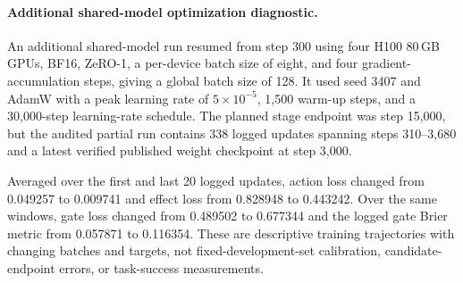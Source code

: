 \paragraph{Additional shared-model optimization diagnostic.}
An additional shared-model run resumed from step 300 using four H100
80\,GB GPUs, BF16, ZeRO-1, a per-device batch size of eight, and four
gradient-accumulation steps, giving a global batch size of 128.
It used seed 3407 and AdamW with a peak learning rate of $5\times10^{-5}$,
1,500 warm-up steps, and a 30,000-step learning-rate schedule.
The planned stage endpoint was step 15,000, but the audited partial run
contains 338 logged updates spanning steps 310--3,680 and a latest
verified published weight checkpoint at step 3,000.

Averaged over the first and last 20 logged updates, action loss changed
from 0.049257 to 0.009741 and effect loss from 0.828948 to 0.443242.
Over the same windows, gate loss changed from 0.489502 to 0.677344 and
the logged gate Brier metric from 0.057871 to 0.116354.
These are descriptive training trajectories with changing batches and
targets, not fixed-development-set calibration, candidate-endpoint errors,
or task-success measurements.

